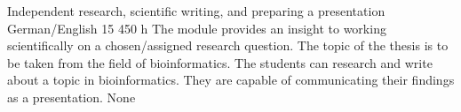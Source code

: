 {Independent research, scientific writing, and preparing a presentation}
{German/English}
{15}
{450 h}
{The module provides an insight to working scientifically on a chosen/assigned research question. The topic of the thesis is to be taken from the field of bioinformatics.}
{The students can research and write about a topic in bioinformatics. They are capable of communicating their findings as a presentation.}
{None}